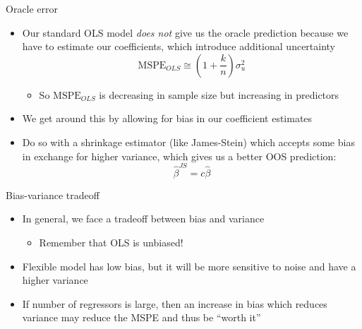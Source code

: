 \documentclass[aspectratio=169]{beamer}
\begin{document}
\begin{frame}{Oracle error}
    \begin{itemize}
        \item Our standard OLS model \textit{does not} give us the oracle prediction because we have to estimate our coefficients, which introduce additional uncertainty
        $$
        \text{MSPE}_{O L S} \cong\left(1+\frac{k}{n}\right) \sigma_u^2
        $$
        \begin{itemize}
            \item So $\text{MSPE}_{O L S}$ is decreasing in sample size but increasing in predictors
        \end{itemize}
        \item We get around this by allowing for bias in our coefficient estimates
        \item Do so with a shrinkage estimator (like James-Stein) which accepts some bias in exchange for higher variance, which gives us a better OOS prediction:
        $$
        \hat{\beta}^{J S}=c \hat{\beta}
        $$

    \end{itemize}
\end{frame}

\begin{frame}{Bias-variance tradeoff}
    \begin{itemize}
        \item In general, we face a tradeoff between bias and variance
        \begin{itemize}
            \item Remember that OLS is unbiased!
        \end{itemize} 
        \item Flexible model has low bias, but it will be more sensitive to noise and have a higher variance
        \item If number of regressors is large, then an increase in bias which reduces variance may reduce the MSPE and thus be ``worth it'' 
    \end{itemize}
\end{frame}


\end{document}
